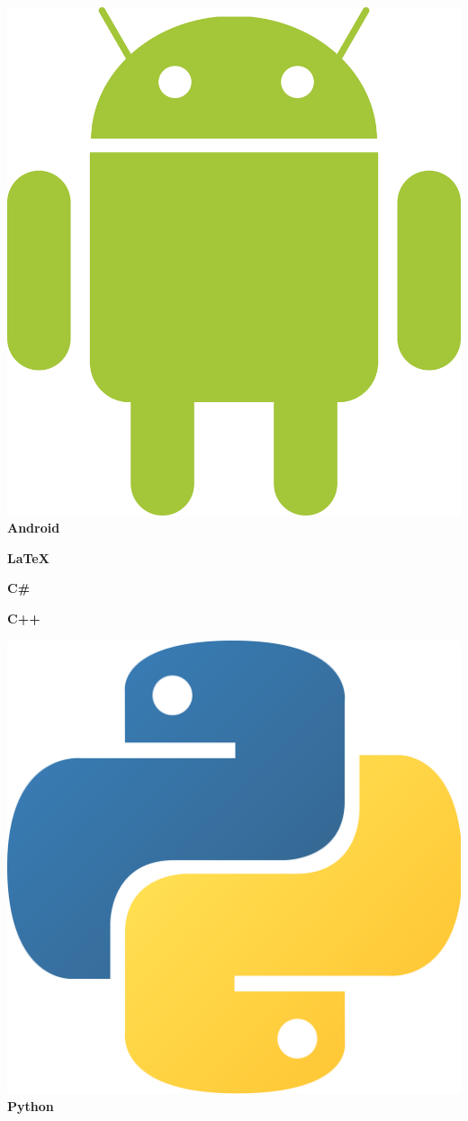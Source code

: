 \documentclass[a4paper]{friggeri-cv}
\begin{document}
\begin{aside}
   \includegraphics[scale=0.0047]{../assets/images/Android_logo.png} \textbf{Android}%
   
   \textbf{\LaTeX}%
   
    \textbf{C\#}%
    
    \textbf{C++}%
    
     \includegraphics[scale=0.0045]{../assets/images/Python_logo.png} \textbf{Python}%
     

\end{aside}
\end{document}
